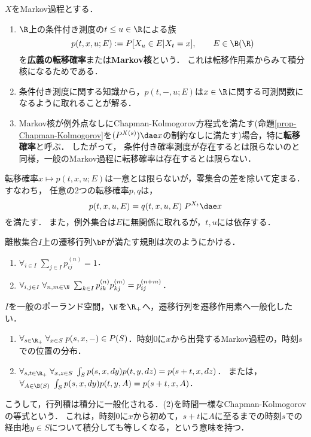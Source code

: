 \documentclass[uplatex,dvipdfmx]{jsreport}
\begin{document}
\begin{definition}
    $X$をMarkov過程とする．
    \begin{enumerate}
        \item $\R$上の条件付き測度の$t\le u\in\R$による族
        \[p(t,x,u;E):=P[X_u\in E|X_t=x],\qquad E\in\B(\R)\]
        を\textbf{広義の転移確率}または\textbf{Markov核}という．
        これは転移作用素からみて積分核になるためである．
        \item 条件付き測度に関する知識から，$p(t,-,u;E)$は$x\in\R$に関する可測関数になるように取れることが解る．
        \item Markov核が例外点なしにChapman-Kolmogorov方程式を満たす(命題\ref{prop-Chapman-Kolmogorov}を$(P^{X(s)})\dae x$の制約なしに満たす)場合，特に\textbf{転移確率}と呼ぶ．
        したがって，
        条件付き確率測度が存在するとは限らないのと同様，一般のMarkov過程に転移確率は存在するとは限らない．
    \end{enumerate}
\end{definition}

\begin{lemma}[Markov核の一意性]
    転移確率$x\mapsto p(t,x,u;E)$は一意とは限らないが，零集合の差を除いて定まる．すなわち，
    任意の2つの転移確率$p,q$は，\[p(t,x,u,E)=q(t,x,u,E)\;P^{X_t}\dae x\]を満たす．
    また，例外集合は$E$に無関係に取れるが，$t,u$には依存する．
\end{lemma}

\begin{observation}[Markov半群のなす半群の連続化]
    離散集合$I$上の遷移行列$\bP$が満たす規則は次のようにかける．
    \begin{enumerate}
        \item $\forall_{i\in I}\;\sum_{j\in I}p_{ij}^{(n)}=1$．
        \item $\forall_{i,j\in I}\;\forall_{n,m\in\N}\;\sum_{k\in I}p_{ik}^{(n)}p_{kj}^{(m)}=p_{ij}^{(n+m)}$．
    \end{enumerate}
    $I$を一般のポーランド空間，$\N$を$\R_+$へ，遷移行列を遷移作用素へ一般化したい．
    \begin{enumerate}
        \item $\forall_{s\in\R_+}\;\forall_{x\in S}\;p(s,x,-)\in P(S)$．時刻$0$に$x$から出発するMarkov過程の，時刻$s$での位置の分布．
        \item $\forall_{s,t\in\R_+}\;\forall_{x,z\in S}\;\int_Sp(s,x,dy)p(t,y,dz)=p(s+t,x,dz)$．
        または，$\forall_{A\in\B(S)}\;\int_Sp(s,x,dy)p(t,y,A)=p(s+t,x,A)$．
    \end{enumerate}
    こうして，行列積は積分に一般化される．(2)を時間一様なChapman-Kolmogorovの等式という．
    これは，時刻$0$に$x$から初めて，$s+t$に$A$に至るまでの時刻$s$での経由地$y\in S$について積分しても等しくなる，という意味を持つ．
\end{observation}
\end{document}

